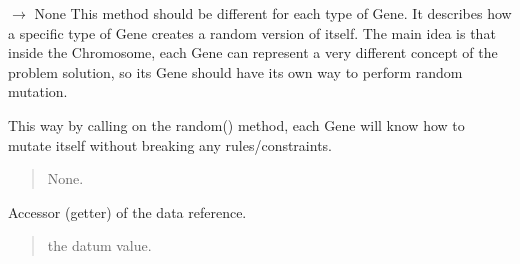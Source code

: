 \documentclass[letterpaper,10pt,english]{sphinxmanual}
\begin{document}
\begin{fulllineitems}
\begin{fulllineitems}
\begin{quote}
\begin{description}
\end{description}\end{quote}

\end{fulllineitems}


\begin{fulllineitems}
\label{\detokenize{pygenalgo.genome:pygenalgo.genome.gene.Gene.random}}
\pysigstartsignatures
\pysiglinewithargsret
{}
{}
{{ $\rightarrow$ None}}
\pysigstopsignatures
\sphinxAtStartPar
This method should be different for each type of Gene. It describes
how a specific type of Gene creates a random version of itself. The
main  idea is that inside the Chromosome, each Gene can represent a
very different concept of the  problem solution, so its Gene should
have its own way to perform random mutation.

\sphinxAtStartPar
This way by calling on the random() method, each Gene will know how
to mutate itself without breaking any rules/constraints.
\begin{quote}\begin{description}
\sphinxAtStartPar
None.

\end{description}\end{quote}

\end{fulllineitems}


\begin{fulllineitems}
\label{\detokenize{pygenalgo.genome:pygenalgo.genome.gene.Gene.value}}
\pysigstartsignatures
\pysigline
{}
\pysigstopsignatures
\sphinxAtStartPar
Accessor (getter) of the data reference.
\begin{quote}\begin{description}
\sphinxAtStartPar
the datum value.

\end{description}\end{quote}

\end{fulllineitems}


\end{fulllineitems}
\end{document}
